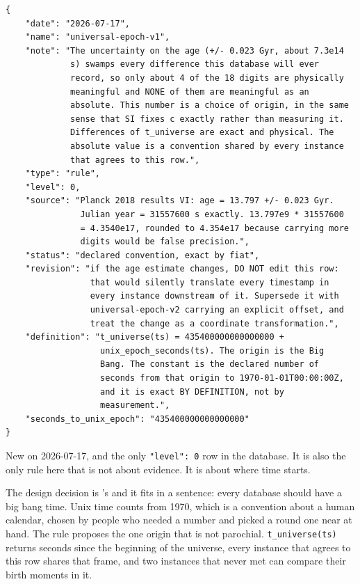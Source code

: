 \begin{lstlisting}[language={},basicstyle=\ttfamily\footnotesize]
{
    "date": "2026-07-17",
    "name": "universal-epoch-v1",
    "note": "The uncertainty on the age (+/- 0.023 Gyr, about 7.3e14
             s) swamps every difference this database will ever
             record, so only about 4 of the 18 digits are physically
             meaningful and NONE of them are meaningful as an
             absolute. This number is a choice of origin, in the same
             sense that SI fixes c exactly rather than measuring it.
             Differences of t_universe are exact and physical. The
             absolute value is a convention shared by every instance
             that agrees to this row.",
    "type": "rule",
    "level": 0,
    "source": "Planck 2018 results VI: age = 13.797 +/- 0.023 Gyr.
               Julian year = 31557600 s exactly. 13.797e9 * 31557600
               = 4.3540e17, rounded to 4.354e17 because carrying more
               digits would be false precision.",
    "status": "declared convention, exact by fiat",
    "revision": "if the age estimate changes, DO NOT edit this row:
                 that would silently translate every timestamp in
                 every instance downstream of it. Supersede it with
                 universal-epoch-v2 carrying an explicit offset, and
                 treat the change as a coordinate transformation.",
    "definition": "t_universe(ts) = 435400000000000000 +
                   unix_epoch_seconds(ts). The origin is the Big
                   Bang. The constant is the declared number of
                   seconds from that origin to 1970-01-01T00:00:00Z,
                   and it is exact BY DEFINITION, not by
                   measurement.",
    "seconds_to_unix_epoch": "435400000000000000"
}
\end{lstlisting}

New on 2026-07-17, and the only \texttt{"level": 0} row in the database. It is also the only rule here that is not about evidence. It is about where time starts.

The design decision is \labPI's and it fits in a sentence: every database should have a big bang time. Unix time counts from 1970, which is a convention about a human calendar, chosen by people who needed a number and picked a round one near at hand. The rule proposes the one origin that is not parochial. \texttt{t\_universe(ts)} returns seconds since the beginning of the universe, every instance that agrees to this row shares that frame, and two instances that never met can compare their birth moments in it.

